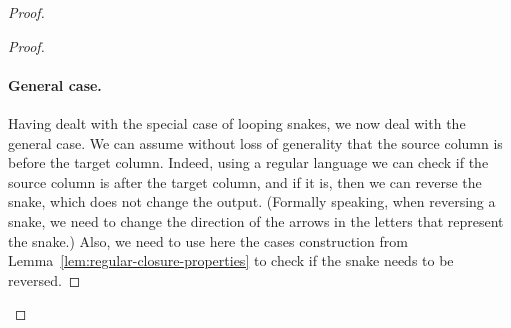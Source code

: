 \begin{proof}
\begin{proof}
    \paragraph*{General case.} Having dealt with the special case of  looping snakes, we now deal with the general case.   We can assume without loss of generality that the source column is before the target column. Indeed, using a regular language we can check if the source column is after the target column, and if it is, then we can reverse the snake, which does not change the output. (Formally speaking, when reversing a snake, we need to change the direction of the arrows in the letters that represent the snake.) Also, we need to use here the cases construction from Lemma~\ref{lem:regular-closure-properties} to check if the snake needs to be reversed.
    

\end{proof}
\end{proof}
